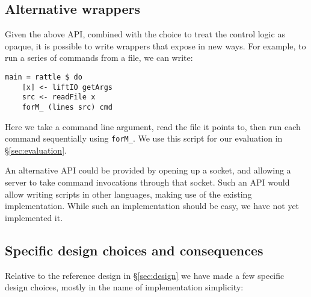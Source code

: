 \subsection{Alternative \Rattle wrappers}

Given the above API, combined with the choice to treat the control logic as opaque, it is possible to write wrappers that expose \Rattle in new ways. For example, to run a series of commands from a file, we can write:

\vspace{3mm}
\begin{small}
\begin{verbatim}
main = rattle $ do
    [x] <- liftIO getArgs
    src <- readFile x
    forM_ (lines src) cmd
\end{verbatim}
\end{small}
\vspace{3mm}

Here we take a command line argument, read the file it points to, then run each command sequentially using \texttt{forM\_}. We use this script for our evaluation in \S\ref{sec:evaluation}.

An alternative API could be provided by opening up a socket, and allowing a \Rattle server to take command invocations through that socket. Such an API would allow writing \Rattle scripts in other languages, making use of the existing \Rattle implementation. While such an implementation should be easy, we have not yet implemented it.

\subsection{Specific design choices and consequences}
\label{sec:choices}

Relative to the reference design in \S\ref{sec:design} we have made a few specific design choices, mostly in the name of implementation simplicity:

